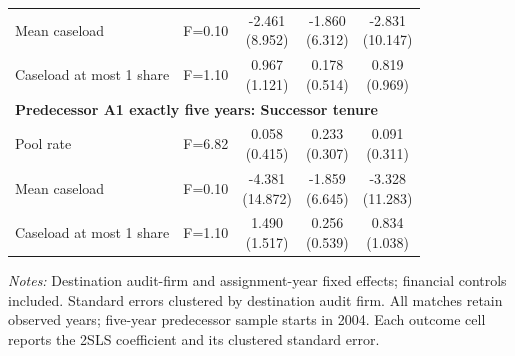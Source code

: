 \documentclass[10pt]{article}
\begin{document}
\begin{minipage}{19cm}
\begin{threeparttable}
\begin{tabular}{p{}cccc}
Mean caseload & F=0.10 & \shortstack{-2.461\\(8.952)} & \shortstack{-1.860\\(6.312)} & \shortstack{-2.831\\(10.147)} \\
Caseload at most 1 share & F=1.10 & \shortstack{0.967\\(1.121)} & \shortstack{0.178\\(0.514)} & \shortstack{0.819\\(0.969)} \\
\multicolumn{5}{l}{\textbf{Predecessor A1 exactly five years: Successor tenure}} \\
Pool rate & F=6.82 & \shortstack{0.058\\(0.415)} & \shortstack{0.233\\(0.307)} & \shortstack{0.091\\(0.311)} \\
Mean caseload & F=0.10 & \shortstack{-4.381\\(14.872)} & \shortstack{-1.859\\(6.645)} & \shortstack{-3.328\\(11.283)} \\
Caseload at most 1 share & F=1.10 & \shortstack{1.490\\(1.517)} & \shortstack{0.256\\(0.539)} & \shortstack{0.834\\(1.038)} \\
\bottomrule
\end{tabular}
\begin{tablenotes}\fontsize{9}{11}\selectfont
\item \raggedright \fontsize{9}{11}\selectfont \textit{Notes:} Destination audit-firm and assignment-year fixed effects; financial controls included. Standard errors clustered by destination audit firm. All matches retain observed years; five-year predecessor sample starts in 2004. Each outcome cell reports the 2SLS coefficient and its clustered standard error.
\end{tablenotes}
\end{threeparttable}

\end{minipage}
\end{document}
